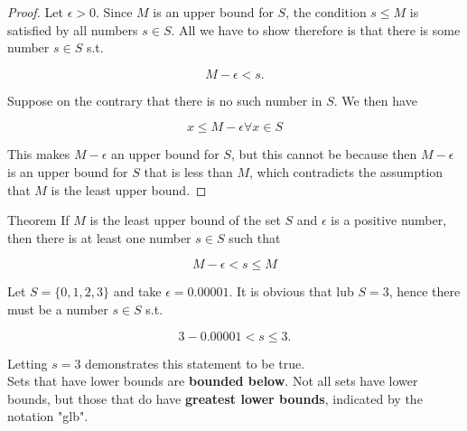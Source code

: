         \begin{proof}
            Let $\epsilon > 0$. Since $M$ is an upper bound for $S$, the condition $s\leq M$ is satisfied by all numbers $s\in S$. All we have to show therefore is that there is some number $s\in S$ s.t.

            \[
                M - \epsilon < s.
            \]

            Suppose on the contrary that there is no such number in $S$. We then have

            \[
                x \leq M - \epsilon \forall x \in S
            \]

            This makes $M - \epsilon$ an upper bound for $S$, but this cannot be because then $M- \epsilon$ is an upper bound for $S$ that is less than $M$, which contradicts the assumption that $M$ is the least upper
            bound.
        \end{proof}

        \begin{theorem}{Theorem}
            If $M$ is the least upper bound of the set $S$ and $\epsilon$ is a positive number, then there is at least one number $s\in S$ such that

            \[
                M - \epsilon < s \leq M
            \]
        \end{theorem}

        \textit{} Let $S = \{0,1,2,3\}$ and take $\epsilon = 0.00001$. It is obvious that lub $S=3$, hence there must be a number $s\in S$ s.t.

        \[
            3 - 0.00001 < s \leq 3.
        \]

        Letting $s=3$ demonstrates this statement to be true. \\

        Sets that have lower bounds are \textbf{bounded below}. Not all sets have lower bounds, but those that do have \textbf{greatest lower bounds}, indicated by the notation "glb".

